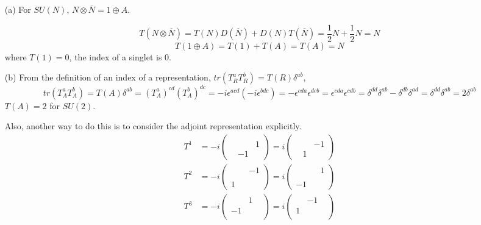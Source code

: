 \documentclass[twoside]{amsart}
\newcommand{\solutionhead}[1]
  {\smallskip
   \noindent{\large\bf Solution #1.}
   }
\begin{document}
\solutionhead{70.2}
\begin{itemize}
\item[(a)] For $SU(N)$, $N \otimes \overline{N} = 1 \oplus A$.  

\[
T(N \otimes \overline{N} )  = T(N) D(\overline{N}) + D(N) T(\overline{N}) = \frac{1}{2} N  + \frac{1}{2} N = N 
\]
\[
T(1 \oplus A) = T(1) + T(A) = \boxed{ T(A) = N }
\]
where $\boxed{ T(1) = 0 } $, the index of a singlet is 0.  
\item[(b)] From the definition of an index of a representation, $tr(T^a_R T^b_R) = T(R) \delta^{ab}$, 
\[
tr(T_A^a T_A^b) = T(A) \delta^{ab} = (T^a_A)^{cd} (T^b_A)^{dc} = -i \epsilon^{acd} (-i \epsilon^{bdc} ) = - \epsilon^{cda} \epsilon^{dcb} = \epsilon^{cda} \epsilon^{cdb} = \delta^{dd} \delta^{ab} - \delta^{db} \delta^{ad} = \delta^{dd} \delta^{ab} = 2 \delta^{ab}
\]
$T(A)=2$ for $SU(2)$.  

Also, another way to do this is to consider the adjoint representation explicitly.  
\[
\begin{aligned}
  T^{1} & = - i \left( \begin{matrix} & &  \\ & & 1 \\ & -1 & \end{matrix} \right) = i \left( \begin{matrix} & & \\ & & -1 \\ & 1 & \end{matrix} \right) \\
  T^2 & = -i \left( \begin{matrix} & & -1 \\ & & \\ 1 & & \end{matrix} \right) = i \left( \begin{matrix}  & & 1 \\ & & \\  -1 & & \end{matrix} \right) \\ 
  T^3 & = -i \left( \begin{matrix} & 1 & \\ -1 & & \\ & & \end{matrix} \right) = i \left( \begin{matrix} & -1 & \\ 1 & & \\ & & \end{matrix} \right) 
\end{aligned}
\]


\end{itemize}
\end{document}
